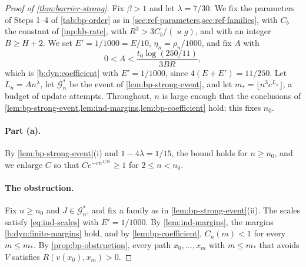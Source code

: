 \begin{proof}[Proof of \cref{thm:barrier-strong}]
Fix $\beta>1$ and let $\lambda=7/30$. We fix the parameters of Steps 1--4 of \cref{tab:bp-order} as in \cref{sec:ref-parameters,sec:ref-families}, with $C_b$ the constant of \cref{inp:hb-rate}, with $R^3>3C_b/(\varkappa g)$, and with an integer $B\ge H+2$. We set $E'=1/1000=E/10$, $\eta_n=\rho_n/1000$, and fix $A$ with
\[
 0<A<\frac{t_0\log(250/11)}{3BR},
\]
which is \eqref{b:dyn:coefficient} with $E'=1/1000$, since $4(E+E')=11/250$. Let $L_n=An^\lambda$, let $\mathcal G_n^*$ be the event of \cref{lem:bp-strong-event}, and let $m_*=\lfloor n^3e^{L_n}\rfloor$, a budget of update attempts. Throughout, $n$ is large enough that the conclusions of \cref{lem:bp-strong-event,lem:ind-margins,lem:bp-coefficient} hold; this fixes $n_0$.

\paragraph{Part (a).} By \cref{lem:bp-strong-event}(i) and $1-4\lambda=1/15$, the bound holds for $n\ge n_0$, and we enlarge $C$ so that $Ce^{-cn^{1/15}}\ge1$ for $2\le n<n_0$.

\paragraph{The obstruction.} Fix $n\ge n_0$ and $J\in\mathcal G_n^*$, and fix a family as in \cref{lem:bp-strong-event}(ii). The scales satisfy \eqref{eq:ind-scales} with $E'=1/1000$. By \cref{lem:ind-margins}, the margins \eqref{b:dyn:finite-margins} hold, and by \cref{lem:bp-coefficient}, $C_n(m)<1$ for every $m\le m_*$. By \cref{prop:bp-obstruction}, every path $x_0,\dots,x_m$ with $m\le m_*$ that avoids $V$ satisfies $R(v(x_0),x_m)>0$.


\end{proof}
